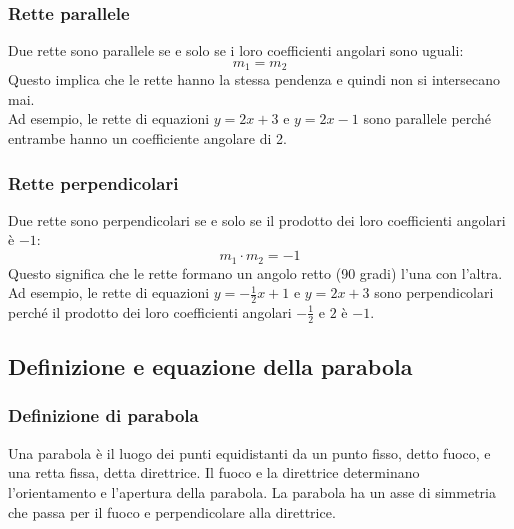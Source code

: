 \documentclass{article}
\begin{document}
\newpage
\subsubsection{Rette parallele}
Due rette sono parallele se e solo se i loro coefficienti angolari sono uguali:
\[
    m_1 = m_2
\]
Questo implica che le rette hanno la stessa pendenza e quindi non si intersecano mai.\\
Ad esempio, le rette di equazioni \(y = 2x + 3\) e \(y = 2x - 1\) sono parallele perché
entrambe hanno un coefficiente angolare di 2.


\newpage
\subsubsection{Rette perpendicolari}
Due rette sono perpendicolari se e solo se il prodotto dei loro coefficienti angolari è \(-1\):
\[
    m_1 \cdot m_2 = -1
\]
Questo significa che le rette formano un angolo retto (90 gradi) l'una con l'altra. Ad esempio,
le rette di equazioni \(y = -\frac{1}{2}x + 1\) e \(y = 2x + 3\) sono perpendicolari perché il
prodotto dei loro coefficienti angolari \(-\frac{1}{2}\) e \(2\) è \(-1\).


\newpage
\subsection{Definizione e equazione della parabola}

\subsubsection{Definizione di parabola}
Una parabola è il luogo dei punti equidistanti da un punto fisso, detto fuoco, e una retta
fissa, detta direttrice. Il fuoco e la direttrice determinano l'orientamento e l'apertura
della parabola. La parabola ha un asse di simmetria che passa per il fuoco e perpendicolare
alla direttrice.
\end{document}
